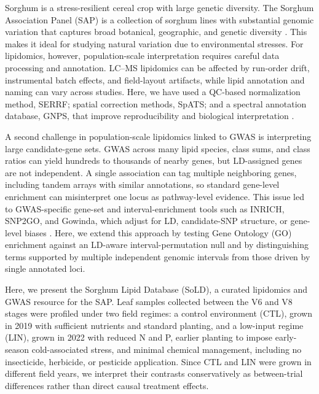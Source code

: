 \documentclass[9pt,twocolumn,twoside]{rilabRxiv}
\begin{document}
Sorghum is a stress-resilient cereal crop with large genetic diversity. The Sorghum Association Panel (SAP) is a collection of sorghum lines with substantial genomic variation that captures broad botanical, geographic, and genetic diversity \citep{Casa2008CommunityResourcesSorghum, Boatwright2022}. This makes it ideal for studying natural variation due to environmental stresses. For lipidomics, however, population-scale interpretation requires careful data processing and annotation. LC–MS lipidomics can be affected by run-order drift, instrumental batch effects, and field-layout artifacts, while lipid annotation and naming can vary across studies. Here, we have used a QC-based normalization method, SERRF; spatial correction methods, SpATS; and a spectral annotation database, GNPS, that improve reproducibility and biological interpretation \citep{Fan2019, RodriguezAlvarez2018, Wang2016GNPS, Molenaar2019}.

A second challenge in population-scale lipidomics linked to GWAS is interpreting large candidate-gene sets. GWAS across many lipid species, class sums, and class ratios can yield hundreds to thousands of nearby genes, but LD-assigned genes are not independent. A single association can tag multiple neighboring genes, including tandem arrays with similar annotations, so standard gene-level enrichment can misinterpret one locus as pathway-level evidence. This issue led to GWAS-specific gene-set and interval-enrichment tools such as INRICH, SNP2GO, and Gowinda, which adjust for LD, candidate-SNP structure, or gene-level biases \citep{Lee2012INRICH,Szkiba2014SNP2GO,Kofler2012Gowinda}. Here, we extend this approach by testing Gene Ontology (GO) enrichment against an LD-aware interval-permutation null and by distinguishing terms supported by multiple independent genomic intervals from those driven by single annotated loci.

Here, we present the Sorghum Lipid Database (SoLD), a curated lipidomics and GWAS resource for the SAP. Leaf samples collected between the V6 and V8 stages were profiled under two field regimes: a control environment (CTL), grown in 2019 with sufficient nutrients and standard planting, and a low-input regime (LIN), grown in 2022 with reduced N and P, earlier planting to impose early-season cold-associated stress, and minimal chemical management, including no insecticide, herbicide, or pesticide application. Since CTL and LIN were grown in different field years, we interpret their contrasts conservatively as between-trial differences rather than direct causal treatment effects. 
\end{document}
